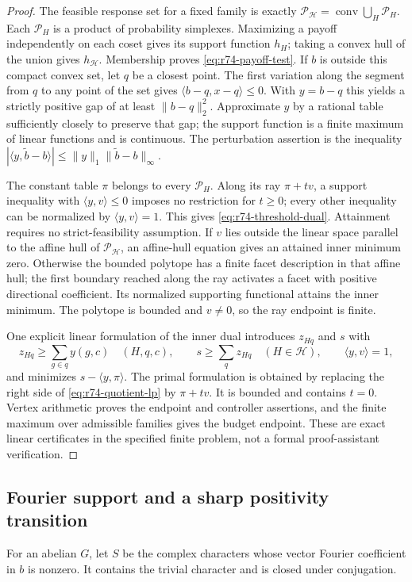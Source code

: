 \begin{proof}
The feasible response set for a fixed family is exactly
$\mathcal P_{\mathcal H}=\operatorname{conv}\bigcup_H\mathcal P_H$.
Each $\mathcal P_H$ is a product of probability simplexes. Maximizing a
payoff independently on each coset gives its support function $h_H$;
taking a convex hull of the union gives $h_{\mathcal H}$.
Membership proves \eqref{eq:r74-payoff-test}. If $b$ is outside this compact
convex set, let $q$ be a closest point. The first variation along the
segment from $q$ to any point of the set gives
$\langle b-q,x-q\rangle\le0$. With $y=b-q$ this yields a strictly
positive gap of at least $\|b-q\|_2^2$. Approximate $y$ by a rational
table sufficiently closely to preserve that gap; the support function is
a finite maximum of linear functions and is continuous. The perturbation
assertion is the inequality
$|\langle y,\widetilde b-b\rangle|\le\|y\|_1
\|\widetilde b-b\|_\infty$.

The constant table $\pi$ belongs to every $\mathcal P_H$. Along its ray
$\pi+tv$, a support inequality with $\langle y,v\rangle\le0$ imposes
no restriction for $t\ge0$; every other inequality can be normalized by
$\langle y,v\rangle=1$. This gives \eqref{eq:r74-threshold-dual}.
Attainment requires no strict-feasibility assumption. If $v$ lies outside
the linear space parallel to the affine hull of $\mathcal P_{\mathcal H}$,
an affine-hull equation gives an attained inner minimum zero. Otherwise
the bounded polytope has a finite facet description in that affine hull;
the first boundary reached along the ray activates a facet with positive
directional coefficient. Its normalized supporting functional attains
the inner minimum. The polytope is bounded and $v\ne0$, so the ray endpoint
is finite.

One explicit linear formulation of the inner dual introduces $z_{Hq}$
and $s$ with
\[
 z_{Hq}\ge\sum_{g\in q}y(g,c)\quad(H,q,c),\qquad
 s\ge\sum_qz_{Hq}\quad(H\in\mathcal H),\qquad
 \langle y,v\rangle=1,
\]
and minimizes $s-\langle y,\pi\rangle$. The primal formulation is obtained
by replacing the right side of \eqref{eq:r74-quotient-lp} by $\pi+tv$.
It is bounded and contains $t=0$. Vertex arithmetic proves the endpoint
and controller assertions, and the finite maximum over admissible families
gives the budget endpoint. These are exact linear certificates in the
specified finite problem, not a formal proof-assistant verification.
\end{proof}

\subsection{Fourier support and a sharp positivity transition}
For an abelian $G$, let $S$ be the complex characters whose vector Fourier
coefficient in $b$ is nonzero. It contains the trivial character and is
closed under conjugation.

